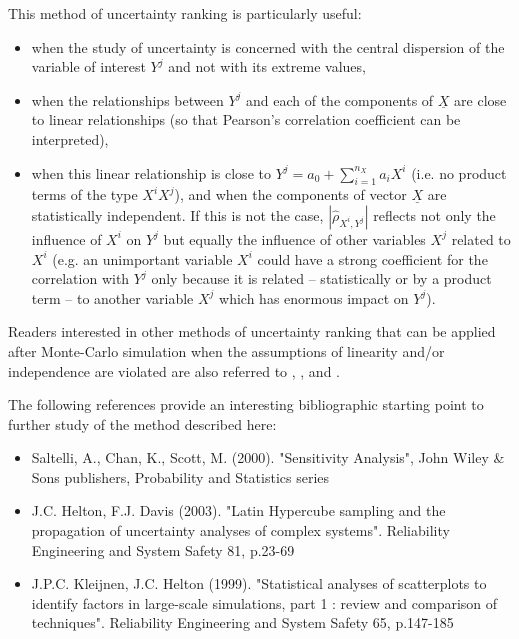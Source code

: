 {
  This method of uncertainty ranking is particularly useful:
  \begin{itemize}
  \item when the study of uncertainty is concerned with the central dispersion of the variable of interest $Y^j$ and not with its extreme values,
  \item when the relationships between $Y^j$ and each of the components of $\underline{X}$ are close to linear relationships (so that Pearson's correlation coefficient can be interpreted),
  \item when this linear relationship is close to  $Y^j = a_0 + \sum_{i=1}^{n_X} a_i X^i$ (i.e. no product terms of the type $X^i X^j$), and when the components of vector $\underline{X}$ are statistically independent.  If this is not the case, $\left| \widehat{\rho}_{X^i,Y^j} \right|$  reflects not only the influence of $X^i$ on $Y^j$ but equally the influence of  other variables $X^j$ related to $X^i$ (e.g. an unimportant variable $X^i$ could have a strong coefficient for the correlation with $Y^j$ only because it is related -- statistically or by a product term -- to another variable $X^j$ which has enormous impact on $Y^j$).
  \end{itemize}

  Readers interested in other methods of uncertainty ranking that can be applied after Monte-Carlo simulation when the assumptions of linearity and/or independence are violated are also referred to , ,  and .

  The following references provide an interesting bibliographic starting point to further study of the method described here:
  \begin{itemize}
  \item Saltelli, A., Chan, K., Scott, M. (2000). "Sensitivity Analysis", John Wiley \& Sons publishers, Probability and Statistics series
  \item J.C. Helton, F.J. Davis (2003). "Latin Hypercube sampling and the propagation of uncertainty analyses of complex systems". Reliability Engineering and System Safety 81, p.23-69
  \item J.P.C. Kleijnen, J.C. Helton (1999). "Statistical analyses of scatterplots to identify factors in large-scale simulations, part 1 : review and comparison of techniques". Reliability Engineering and System Safety 65, p.147-185
  \end{itemize}
}
